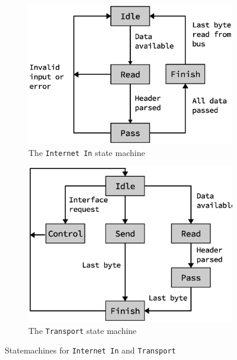\begin{figure}[t]
    \centering
    \begin{subfigure}[t]{0.5\textwidth}
        \centering
        \includegraphics[scale=0.45]{implementation/internet_in_fsm.eps}
        \caption{The \texttt{Internet In} state machine}
    \end{subfigure}%
    \begin{subfigure}[t]{0.5\textwidth}
        \centering
        \includegraphics[scale=0.45]{implementation/transport_fsm.eps}
        \caption{The \texttt{Transport} state machine}
    \end{subfigure}%

    \caption{Statemachines for \texttt{Internet In} and \texttt{Transport}}
    \label{fig:statemachines_internetin_transport}
\end{figure}


